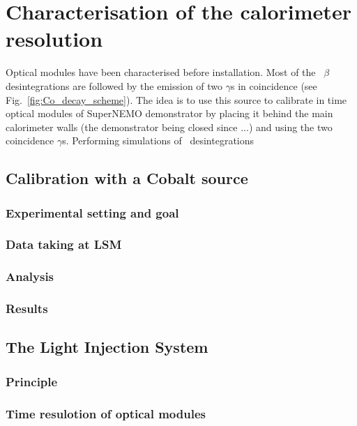 \chapter{Characterisation of the calorimeter resolution}

Optical modules have been characterised before installation.
Most of the \Co\ $\beta$ desintegrations are followed by the emission of two $\gamma$s in coincidence (see Fig.~\ref{fig:Co_decay_scheme}).
The idea is to use this source to calibrate in time optical modules of SuperNEMO demonstrator by placing it behind the main calorimeter walls (the demonstrator being closed since ...) and using the two coincidence $\gamma$s.
Performing simulations of \Co\ desintegrations



\section{Calibration with a Cobalt source}
\label{sec:CoSource}

\subsection{Experimental setting and goal}
\subsection{Data taking at LSM}
\subsection{Analysis}
\subsection{Results}


\section{The Light Injection System}
\label{sec:LIS}

\subsection{Principle}
\subsection{Time resulotion of optical modules}

